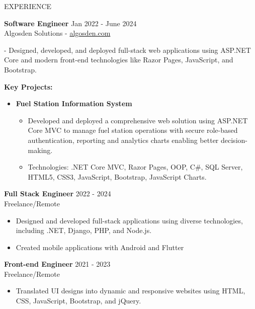 \documentclass{resume} %
\begin{document}
\begin{rSection}{EXPERIENCE}
	
	\textbf{Software Engineer} \hfill Jan 2022 - June 2024\\
	Algosden Solutions -  \href{https://www.algosden.com/}{algosden.com}
		\itemsep 1pt {} 
		\item - Designed, developed, and deployed full-stack web applications using ASP.NET Core and modern front-end technologies like Razor Pages, JavaScript, and Bootstrap. 
		
		\item 
		\textbf{Key Projects:}
		\begin{itemize}
			\itemsep -3pt {} 
			\item \textbf{Fuel Station Information System}
			
			\begin{itemize}
				\itemsep -3pt {} 
				\item Developed and deployed a comprehensive web solution using ASP.NET Core MVC to manage fuel station operations with secure role-based authentication, reporting and analytics charts enabling better decision-making.

				\item Technologies: .NET Core MVC, Razor Pages, OOP, C\#, SQL Server, HTML5, CSS3, JavaScript, Bootstrap, JavaScript Charts.
			\end{itemize}
		\end{itemize}
	
		 
	
	\textbf{Full Stack Engineer} \hfill 2022 - 2024\\
	Freelance/Remote %
	\begin{itemize}
		\itemsep -3pt {} 
		\item Designed and developed full-stack applications using diverse technologies, including .NET, Django, PHP, and Node.js.
		\item Created mobile applications with Android and Flutter
	\end{itemize}
	
	
	\textbf{Front-end Engineer} \hfill 2021  - 2023\\
	Freelance/Remote  \hfill %
	\begin{itemize}
		\itemsep -3pt {} 
		\item Translated UI designs into dynamic and responsive websites using HTML, CSS, JavaScript, Bootstrap, and jQuery.
		

\end{itemize}
\end{rSection}
\end{document}

